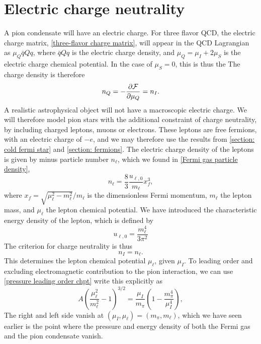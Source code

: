 \section{Electric charge neutrality}


A pion condensate will have an electric charge.
For three flavor QCD, the electric charge matrix, \autoref{three-flavor charge matrix}, will appear in the QCD Lagrangian as $\mu_Q \bar q Q q$, where $\bar q Q q$ is the electric charge density, and $\mu_Q = \mu_I + 2 \mu_S$ is the electric charge chemical potential.
In the case of $\mu_S = 0$, this is thus the 
The charge density is therefore
%
\begin{equation}
    n_Q = - \pdv{\mathcal{F}}{\mu_Q} = n_I.
\end{equation}
%
A realistic astrophysical object will not have a macroscopic electric charge.
We will therefore model pion stars with the additional constraint of charge neutrality, by including charged leptons, muons or electrons.
These leptons are free fermions, with an electric charge of $- e$, and we may therefore use the results from \autoref{section: cold fermi star} and \autoref{section: fermions}.
The electric charge density of the leptons is given by minus particle number $n_\ell$, which we found in \autoref{Fermi gas particle density},
%
\begin{equation}
    n_{\ell} = \frac{8}{3} \frac{u_{\ell, 0}}{m_\ell} x_f^3,
\end{equation}
%
where $x_f = \sqrt{\mu^2_\ell - m_\ell^2}/m_\ell$ is the dimensionless Fermi momentum, $m_\ell$ the lepton mass, and $\mu_\ell$ the lepton chemical potential.
We have introduced the characteristic energy density of the lepton, which is defined by
%
\begin{equation}
    u_{\ell, 0} = \frac{m^4_\ell}{3 \pi^2}
\end{equation}
%
The criterion for charge neutrality is thus
%
\begin{equation}
    n_I = n_\ell.
\end{equation}
%
This determines the lepton chemical potential $\mu_\ell$, given $\mu_I$.
To leading order and excluding electromagnetic contribution to the pion interaction, we can use \autoref{pressure leading order chpt} write this explicitly as
%
\begin{equation}
    A \left(\frac{\mu_\ell^2 }{m_\ell^2} - 1 \right)^{3/2}
    = \frac{\mu_I}{m_\pi}\left( 1 - \frac{m_\pi^4}{\mu_I^4}  \right),
\end{equation}
%
The right and left side vanish at $(\mu_I, \mu_\ell) = (m_\pi, m_\ell)$, which we have seen earlier is the point where the pressure and energy density of both the Fermi gas and the pion condensate vanish.
